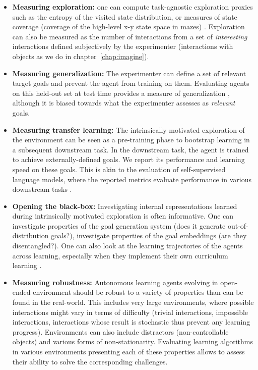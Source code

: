\begin{itemize}[noitemsep]
    \item \textbf{Measuring exploration:} one can compute task-agnostic exploration proxies such as the entropy of the
    visited state distribution, or measures of state coverage (\eg coverage of the high-level x-y state space in mazes) \citep{goalgan}. Exploration can also be measured as the number of interactions from a set of \textit{interesting} interactions defined subjectively by the experimenter (interactions with objects as we do in chapter~\ref{chap:imagine}).
    \item \textbf{Measuring generalization:} The experimenter can define a set of relevant target goals
    and prevent the agent from training on them. Evaluating agents on this held-out set at test time provides a measure of generalization \citep{ruis2020benchmark}, although it is biased towards what the experimenter assesses as \textit{relevant} goals.
    \item \textbf{Measuring transfer learning:} The intrinsically motivated exploration of the environment can be seen as a pre-training phase to bootstrap learning in a subsequent downstream task. In the downstream task, the agent is trained to achieve externally-defined goals. We report its performance and learning speed on these goals. This is akin to the evaluation of self-supervised language models, where the reported metrics evaluate performance in various downstream tasks \citep{brown2020language}. 
    \item \textbf{Opening the black-box:} Investigating internal representations learned during intrinsically motivated exploration is often informative. One can investigate properties of the goal generation system (\eg does it generate out-of-distribution goals?), investigate properties of the goal embeddings (\eg are they disentangled?). One can also look at the learning trajectories of the agents across learning, especially when they implement their own curriculum learning \citep{goalgan,curious,blaes2019control,pong2019skew,akakzia2020decstr}.
    \item \textbf{Measuring robustness:} Autonomous learning agents evolving in open-ended environment should be robust to a variety of properties than can be found in the real-world. This includes very large environments, where possible interactions might vary in terms of difficulty (trivial interactions, impossible interactions, interactions whose result is stochastic thus prevent any learning progress). Environments can also include distractors (\eg non-controllable objects) and various forms of non-stationarity. Evaluating learning algorithms in various environments presenting each of these properties allows to assess their ability to solve the corresponding challenges.
\end{itemize}

